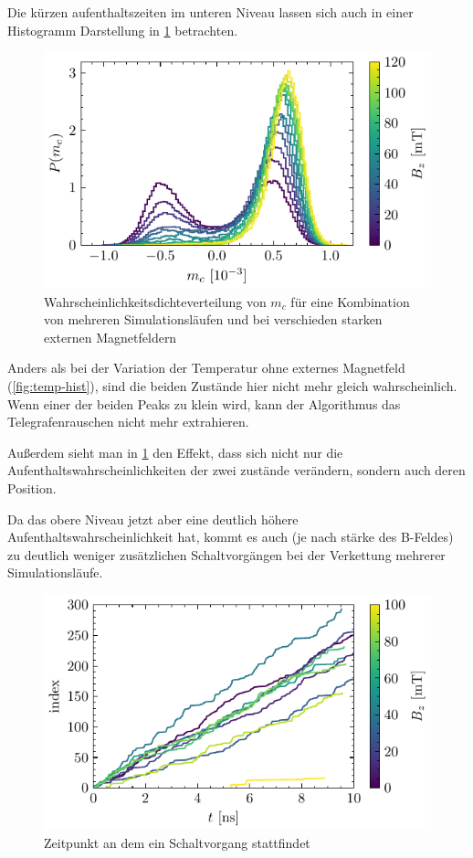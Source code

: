 \documentclass[main.tex]{subfiles}
\begin{document}
Die kürzen aufenthaltszeiten im unteren Niveau lassen sich auch in einer Histogramm Darstellung in \cref{fig:b-hist} betrachten.

\begin{figure}[H]
    \centering
    \includegraphics{bilder/plots/max_Bz/mc_hist.pdf}
    \caption{Wahrscheinlichkeitsdichteverteilung von \(m_c\) für eine Kombination von mehreren Simulationsläufen und bei verschieden starken externen Magnetfeldern}\label{fig:b-hist}    
\end{figure}

Anders als bei der Variation der Temperatur ohne externes Magnetfeld (\cref{fig:temp-hist}), sind die beiden Zustände hier nicht mehr gleich wahrscheinlich. Wenn einer der beiden Peaks zu klein wird, kann der Algorithmus das Telegrafenrauschen nicht mehr extrahieren. 

Außerdem sieht man in \cref{fig:b-hist} den Effekt, dass sich nicht nur die Aufenthaltswahrscheinlichkeiten der zwei zustände verändern, sondern auch deren Position. 

Da das obere Niveau jetzt aber eine deutlich höhere Aufenthaltswahrscheinlichkeit hat, kommt es auch (je nach stärke des B-Feldes) zu deutlich weniger zusätzlichen Schaltvorgängen bei der Verkettung mehrerer Simulationsläufe.

\begin{figure}[H]
    \centering
    \includegraphics{bilder/plots/max_Bz/switch_events.pdf}
    \caption{Zeitpunkt an dem ein Schaltvorgang stattfindet}\label{fig:bc-switch-events}   
\end{figure}
\end{document}
